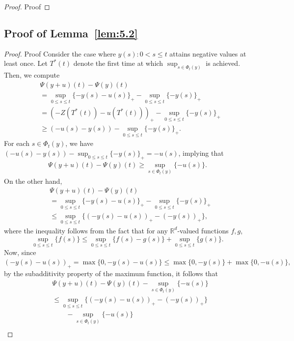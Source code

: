\documentclass[11pt,leqno]{amsart}
\begin{document}
\begin{proof}{Proof}
 \end{proof}
\subsection{Proof of Lemma~\ref{lem:5.2}}
\begin{proof}{Proof}%
Consider the case where $y(s):0< s\leq t$ attains negative values at least once. Let $T^*(t)$ denote the first time at which $\sup_{s\in\Phi_t(y)}$ is achieved. Then, we compute
\begin{align*}
    &\Psi(y+u)(t)-\Psi(y)(t)\\
    &=\sup_{0\leq s\leq t}\{-y(s)-u(s)\}_+-\sup_{0\leq s\leq t}\{-y(s)\}_+\\
    &= \left(-Z(T^*(t))-u(T^*(t))\right)_+-\sup_{0\leq s\leq t}\{-y(s)\}_+\\
    &\geq (-u(s)-y(s))-\sup_{0\leq s\leq t}\{-y(s)\}_+.
\end{align*}
For each $s \in \Phi_t(y)$, we have $(-u(s)-y(s))-\sup_{0\leq s\leq t}\{-y(s)\}_+ = -u(s)$, implying that
\begin{align}\label{eq:fr-lb}
	\Psi(y+u)(t)-\Psi(y)(t) \geq \sup_{s \in \Phi_t(y)}\{-u(s)\}.
\end{align}
On the other hand, 
\begin{align*}
    &\Psi(y+u)(t)-\Psi(y)(t)\\
    &=\sup_{0\leq s\leq t}\{-y(s)-u(s)\}_+-\sup_{0\leq s\leq t}\{-y(s)\}_+\\
    &\leq \sup_{0\leq s\leq t}\{(-y(s)-u(s))_+-(-y(s))_+\},
\end{align*}
where the inequality follows from the fact that for any $\mathbb R^d$-valued functions $f,g$, $$\sup_{0\leq s \leq t}\{f(s)\} \leq \sup_{0 \leq s \leq t}\{f(s)-g(s)\} + \sup_{0 \leq s \leq t}\{g(s)\}.$$
Now, since
\(
   (-y(s)-u(s))_+
   =\max\{0,-y(s)-u(s)\}
   \leq\max\{0,-y(s)\}+\max\{0,-u(s)\},
\)
by the subadditivity property of the maximum function, it follows that 
\begin{align}
    \nonumber &\Psi(y+u)(t)-\Psi(y)(t)-\sup_{s\in\Phi_t(y)}\{-u(s)\}\\
    \nonumber &\leq \sup_{0\leq s\leq t}\{(-y(s)-u(s))_+-(-y(s))_+\}\\
    \nonumber &\qquad-\sup_{s\in\Phi_t(y)}\{-u(s)\}\\

\end{align}
\end{proof}
\end{document}
